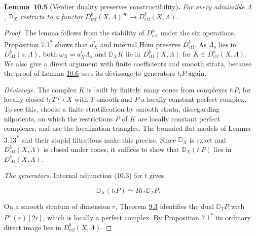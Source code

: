 \documentclass[11pt]{article}
\newenvironment{bpstatement}[2]{\par\addvspace{0.6\baselineskip}\noindent\textbf{#1}#2\textbf{.}\enspace\ignorespaces}
  {\par\addvspace{0.4\baselineskip}}
\newenvironment{bpstatementit}[2]{\begin{bpstatement}{#1}{#2}\itshape\ignorespaces}{\end{bpstatement}}
\newcommand{\bpout}[1]{#1\textsuperscript{\hyperlink{bp-outside}{\ensuremath{\ast}}}}
\begin{document}
\label{bp116}%
\begin{bpstatementit}{Lemma~10.5}{ (Verdier duality preserves constructibility)}
For every admissible \(\Lambda\), \(\mathbb D_X\) restricts to a functor \(D^b_{\mathrm{ctf}}(X,\Lambda)^{\mathrm{op}}\to D^b_{\mathrm{ctf}}(X,\Lambda)\).
\end{bpstatementit}

\begin{proof}[{Proof}]\label{bp117}%
The lemma follows from the stability of \(D^b_{\mathrm{ctf}}\) under the six operations. Proposition \bpout{7.1} shows that \(a_X^!\) and internal Hom preserve \(D^b_{\mathrm{ctf}}\). As \(\Lambda_s\) lies in \(D^b_{\mathrm{ctf}}(s,\Lambda)\), both \(\omega_X=a_X^!\Lambda_s\) and \(\mathbb D_XK\) lie in \(D^b_{\mathrm{ctf}}(X,\Lambda)\) for \(K\in D^b_{\mathrm{ctf}}(X,\Lambda)\). We also give a direct argument with finite coefficients and smooth strata, because the proof of Lemma \hyperref[bp119]{10.6} uses its dévissage to generators \(t_!P\) again.

\emph{Dévissage.} The complex \(K\) is built by finitely many cones from complexes \(t_!P\), for locally closed \(t:T\hookrightarrow X\) with \(T\) smooth and \(P\) a locally constant perfect complex. To see this, choose a finite stratification by smooth strata, disregarding nilpotents, on which the restrictions \(P\) of \(K\) are locally constant perfect complexes, and use the localization triangles. The bounded flat models of Lemma \bpout{3.13} and their stupid filtrations make this precise. Since \(\mathbb D_X\) is exact and \(D^b_{\mathrm{ctf}}(X,\Lambda)\) is closed under cones, it suffices to show that \(\mathbb D_X(t_!P)\) lies in \(D^b_{\mathrm{ctf}}(X,\Lambda)\).

\emph{The generators.} Internal adjunction (10.3) for \(t\) gives

\[
\mathbb D_X(t_!P)\simeq Rt_*\mathbb D_TP.
\]

On a smooth stratum of dimension \(r\), Theorem \hyperref[bp11]{9.3} identifies the dual \(\mathbb D_TP\) with \(P^\vee(r)[2r]\), which is locally a perfect complex. By Proposition \bpout{7.1} its ordinary direct image lies in \(D^b_{\mathrm{ctf}}(X,\Lambda)\).
\end{proof}
\end{document}
